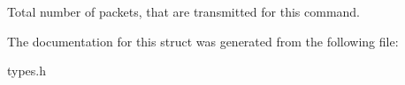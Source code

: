 Total number of packets, that are transmitted for this command. 

The documentation for this struct was generated from the following file\+:\begin{DoxyCompactItemize}
\item 
types.\+h\end{DoxyCompactItemize}
